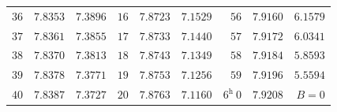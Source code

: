 \begin{center}
{{\begin{minipage}{.83\linewidth}
\begin{tabular}{r|r|r||r|r|r||r|r|r}
$36$ & $7.8353$ & $7.3896$ & $16$ & $7.8723$ & $7.1529$ & $56$ & $7.9160$ & $6.1579$\\
$37$ & $7.8361$ & $7.3855$ & $17$ & $7.8733$ & $7.1440$ & $57$ & $7.9172$ & $6.0341$\\
$38$ & $7.8370$ & $7.3813$ & $18$ & $7.8743$ & $7.1349$ & $58$ & $7.9184$ & $5.8593$\\
$39$ & $7.8378$ & $7.3771$ & $19$ & $7.8753$ & $7.1256$ & $59$ & $7.9196$ & $5.5594$\\
$40$ & $7.8387$ & $7.3727$ & $20$ & $7.8763$ & $7.1160$ & $6^{\mathrm h}\ 0$ & $7.9208$ & $B=0$\\
\end{tabular}


\endgroup
\end{minipage}}}\endgroup
\end{center}
